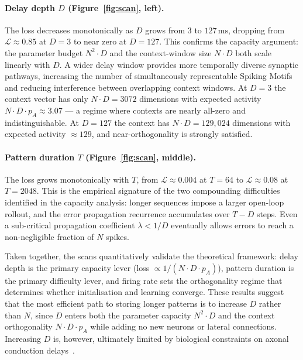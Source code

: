 \documentclass{scrartcl}
\newcommand{\citep}[1]{\parencite{#1}}
\begin{document}
\paragraph{Delay depth $D$ (Figure~\ref{fig:scan}, left).}
The loss decreases monotonically as $D$ grows from $3$ to $127\,\mathrm{ms}$, dropping from $\mathcal{L} \approx 0.85$ at $D = 3$ to near zero at $D = 127$. This confirms the capacity argument: the parameter budget $N^2 \cdot D$ and the context-window size $N \cdot D$ both scale linearly with $D$. A wider delay window provides more temporally diverse synaptic pathways, increasing the number of simultaneously representable Spiking Motifs and reducing interference between overlapping context windows. At $D = 3$ the context vector has only $N \cdot D = 3072$ dimensions with expected activity $N \cdot D \cdot p_A \approx 3.07$ --- a regime where contexts are nearly all-zero and indistinguishable. At $D = 127$ the context has $N \cdot D = 129{,}024$ dimensions with expected activity $\approx 129$, and near-orthogonality is strongly satisfied.


\paragraph{Pattern duration $T$ (Figure~\ref{fig:scan}, middle).}
The loss grows monotonically with $T$, from $\mathcal{L} \approx 0.004$ at $T = 64$ to $\mathcal{L} \approx 0.08$ at $T = 2048$. This is the empirical signature of the two compounding difficulties identified in the capacity analysis: longer sequences impose a larger open-loop rollout, and the error propagation recurrence accumulates over $T - D$ steps. Even a sub-critical propagation coefficient $\lambda < 1/D$ eventually allows errors to reach a non-negligible fraction of $N$ spikes.


Taken together, the  scans quantitatively validate the theoretical framework: delay depth is the primary capacity lever (loss $\propto 1/(N \cdot D \cdot p_A)$), pattern duration is the primary difficulty lever, and firing rate sets the orthogonality regime that determines whether initialisation and learning converge. These results suggest that the most efficient path to storing longer patterns is to increase $D$ rather than $N$, since $D$ enters both the parameter capacity $N^2 \cdot D$ and the context orthogonality $N \cdot D \cdot p_A$ while adding no new neurons or lateral connections. Increasing $D$ is, however, ultimately limited by biological constraints on axonal conduction delays~\citep{Grimaldi2023a}.
\end{document}

